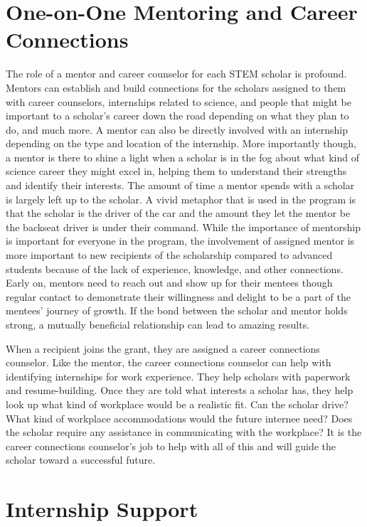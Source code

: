 \documentclass[11.5pt]{sig-alternate}
\begin{document}
\begin{large}
\section*{One-on-One Mentoring and Career Connections}

The role of a mentor and career counselor for each STEM scholar is profound. Mentors can establish and build connections for the scholars assigned to them with career counselors, internships related to science, and people that might be important to a scholar’s career down the road depending on what they plan to do, and much more. A mentor can also be directly involved with an internship depending on the type and location of the internship. More importantly though, a mentor is there to shine a light when a scholar is in the fog about what kind of science career they might excel in, helping them to understand their strengths and identify their interests. The amount of time a mentor spends with a scholar is largely left up to the scholar. A vivid metaphor that is used in the program is that the scholar is the driver of the car and the amount they let the mentor be the backseat driver is under their command. While the importance of mentorship is important for everyone in the program, the involvement of assigned mentor is more important to new recipients of the scholarship compared to advanced students because of the lack of experience, knowledge, and other connections. Early on, mentors need to reach out and show up for their mentees though regular contact to demonstrate their willingness and delight to be a part of the mentees’ journey of growth. If the bond between the scholar and mentor holds strong, a mutually beneficial relationship can lead to amazing results. 

When a recipient joins the grant, they are assigned a career connections counselor. Like the mentor, the career connections counselor can help with identifying internships for work experience. They help scholars with paperwork and resume-building. Once they are told what interests a scholar has, they help look up what kind of workplace would be a realistic fit. Can the scholar drive? What kind of workplace accommodations would the future internee need? Does the scholar require any assistance in communicating with the workplace? It is the career connections counselor’s job to help with all of this and will guide the scholar toward a successful future. 

\section*{Internship Support}


\end{large}
\end{document}
